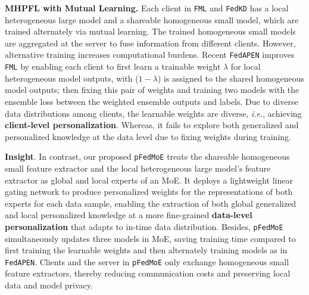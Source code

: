 \documentclass[sigconf]{acmart}
\newcommand{\hetero}{heterogeneous }
\newcommand{\homo}{homogeneous }
\newcommand{\pers}{personalized }
\newcommand{\gen}{generalized }
\newcommand{\methodname}{{\tt{pFedMoE}}}
\begin{document}
\textbf{MHPFL with Mutual Learning.} 
Each client in {\tt{FML}} \citep{FML} and {\tt{FedKD}} \citep{FedKD} has a local \hetero large model and a shareable \homo small model, which are trained alternately via mutual learning. The trained \homo small models are aggregated at the server to fuse information from different clients. However, alternative training increases computational burdens. Recent {\tt{FedAPEN}} \citep{FedAPEN} improves {\tt{FML}} by enabling each client to first learn a trainable weight $\lambda$ for local \hetero model outputs, with ($1-\lambda$) is assigned to the shared \homo model outputs; then fixing this pair of weights and training two models with the ensemble loss between the weighted ensemble outputs and labels. Due to diverse data distributions among clients, the learnable weights are diverse, \emph{i.e.}, achieving \textbf{client-level personalization}. Whereas, it fails to explore both \gen and \pers knowledge at the data level due to fixing weights during training.

\textbf{Insight}.
In contrast, our proposed \methodname{} treats the shareable \homo small feature extractor and the local \hetero large model's feature extractor as global and local experts of an MoE. It deploys a lightweight linear gating network to produce \pers weights for the representations of both experts for each data sample, enabling the extraction of both global \gen and local \pers knowledge at a more fine-grained \textbf{data-level personalization} that adapts to in-time data distribution. 
Besides, \methodname{} simultaneously updates three models in MoE, saving training time compared to first training the learnable weights and then alternately training models as in {\tt{FedAPEN}}. 
Clients and the server in \methodname{} only exchange \homo small feature extractors, thereby reducing communication costs and preserving local data and model privacy.
\end{document}
